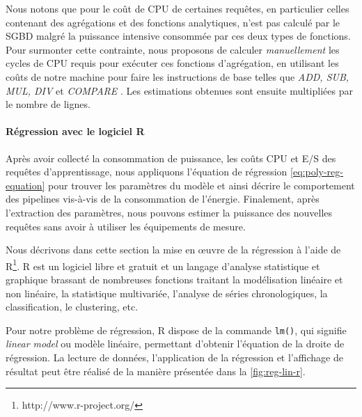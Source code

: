 Nous notons que pour le coût de CPU de certaines requêtes, en particulier celles contenant des agrégations et des fonctions analytiques, n'est pas calculé par le SGBD malgré la puissance intensive consommée par ces deux types de fonctions. Pour surmonter cette contrainte, nous proposons de calculer \textit{manuellement} les cycles de CPU requis pour exécuter ces fonctions d'agrégation, en utilisant les coûts de notre machine pour faire les instructions de base telles que \textit{ADD, SUB, MUL, DIV} et \textit{COMPARE} \cite{IntelOptimize14}. Les estimations obtenues sont ensuite multipliées par le nombre de lignes.

\paragraph{Régression avec le logiciel R}
Après avoir collecté la consommation de puissance, les coûts CPU et E/S des requêtes d'apprentissage, nous appliquons l'équation de régression \eqref{eq:poly-reg-equation} pour trouver les paramètres du modèle et ainsi décrire le comportement des pipelines vis-à-vis de la consommation de l'énergie. Finalement, après l'extraction des paramètres, nous pouvons estimer la puissance des nouvelles requêtes sans avoir à utiliser les équipements de mesure.

Nous décrivons dans cette section la mise en œuvre de la régression à l'aide de R\footnote{http://www.r-project.org/}. R est un logiciel libre et gratuit et un langage d'analyse statistique et graphique \cite{Ihaka96} brassant de nombreuses fonctions traitant la modélisation linéaire et non linéaire, la statistique multivariée, l'analyse de séries chronologiques, la classification, le clustering, etc.

Pour notre problème de régression, R dispose de la commande \texttt{lm()}, qui signifie \textit{linear model} ou modèle linéaire, permettant d'obtenir l'équation de la droite de régression. La lecture de données, l'application de la régression et l'affichage de résultat peut être réalisé de la manière présentée dans la \ref{fig:reg-lin-r}.

